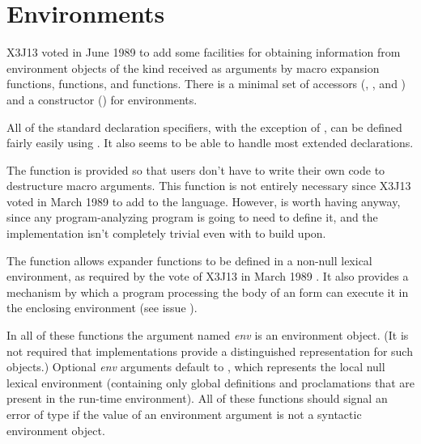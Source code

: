 \section{Environments}

X3J13 voted in June 1989  to add some facilities for obtaining information
from environment objects of the kind received as arguments
by macro expansion functions,  functions,
and  functions.
There is a minimal set of accessors (,
, and ) and a constructor
() for environments.

All of the standard declaration specifiers, with the exception of ,
can be defined fairly easily using .  It also
seems to be able to handle most extended declarations.

The function  is provided so that
users don't have to write their
  own code to destructure macro arguments.
This function is not entirely necessary since X3J13 voted
in March 1989 
to add  to the language.
  However,  is worth having anyway, since any program-analyzing
  program is going to need to define it, and the implementation isn't completely
  trivial even with  to build upon.

  The function  allows expander functions to be defined in a non-null
  lexical environment, as required by the vote of X3J13 in
  March 1989 .  It
  also provides a mechanism by which a program processing
  the body of an  form
  can execute it in the enclosing environment (see issue
  ).

In all of these functions the argument named \emph{env} is an environment
object.  (It is not required that implementations
 provide a distinguished representation for such objects.)  Optional \emph{env}
 arguments default to , which represents the local null lexical environment
 (containing only global definitions and proclamations that are present in the
 run-time environment).  All of these functions should signal an error of type
  if the value of an environment argument is not a syntactic
 environment object.

